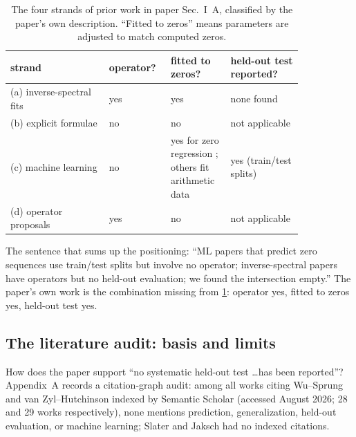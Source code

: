 \begin{table}[htbp]\centering
\caption{The four strands of prior work in paper Sec.~I~A, classified by the paper's own description. ``Fitted to zeros'' means parameters are adjusted to match computed zeros.}\label{tab:paper-setup-strands}
\small
\begin{tabular}{p{0.3\linewidth}p{0.14\linewidth}p{0.18\linewidth}p{0.22\linewidth}}
\toprule
strand & operator? & fitted to zeros? & held-out test reported? \\
\midrule
(a) inverse-spectral fits & yes & yes & none found \\
(b) explicit formulae & no & no & not applicable \\
(c) machine learning & no & yes for zero regression \cite{sdsu}; others fit arithmetic data & yes (train/test splits) \\
(d) operator proposals & yes & no & not applicable \\
\bottomrule
\end{tabular}
\end{table}

The sentence that sums up the positioning: ``ML papers that predict zero sequences use train/test splits but involve no operator; inverse-spectral papers have operators but no held-out evaluation; we found the intersection empty.'' The paper's own work is the combination missing from \cref{tab:paper-setup-strands}: operator yes, fitted to zeros yes, held-out test yes.

\subsection{The literature audit: basis and limits}

How does the paper support ``no systematic held-out test \dots has been reported''? Appendix~A records a citation-graph audit: among all works citing Wu--Sprung \cite{wusprung} and van Zyl--Hutchinson \cite{vanzyl} indexed by Semantic Scholar (accessed August 2026; 28 and 29 works respectively), none mentions prediction, generalization, held-out evaluation, or machine learning; Slater \cite{slater} and Jaksch \cite{jaksch} had no indexed citations.


